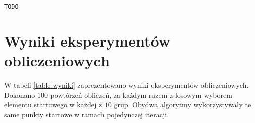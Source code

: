 \documentclass{mwart}
\begin{document}
\begin{lstlisting}[style=JavaStyle]
TODO
\end{lstlisting}

\section{Wyniki eksperymentów obliczeniowych}
W tabeli \ref{table:wyniki} zaprezentowano wyniki eksperymentów obliczeniowych. Dokonano $100$ powtórzeń obliczeń, za każdym razem z losowym wyborem elementu startowego w każdej z $10$ grup. Obydwa algorytmy wykorzystywały te same punkty startowe w ramach pojedynczej iteracji.

\begin{table}[H]
\centering
\caption{Wyniki eksperymentów obliczeniowych dla 100 iteracji}
\label{table:wyniki}
\end{table}
\end{document}
